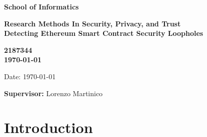 \documentclass[a4paper,11pt]{article}
\newcommand{\examnumber}{2187344}
\newcommand{\field}{Detecting Ethereum Smart Contract Security Loopholes}
\newcommand{\supervisor}{Lorenzo Martinico}
\begin{document}
\begin{minipage}[b]{110mm}
        {\Huge\bf School of Informatics
        \vspace*{17mm}}
\end{minipage}
\hfill
\begin{minipage}[t]{40mm}               
\end{minipage}
\par\noindent
\vspace*{2cm}
\begin{center}
        \Large\bf Research Methods In Security, Privacy, and Trust \\
        \Large\bf \field
\end{center}
\vspace*{1.5cm}
\begin{center}
        \bf \examnumber\\
        \monthyeardate\today
\end{center}
\vspace*{5mm}

%
%                       
\begin{abstract}

\end{abstract}

\vspace*{1cm}

\vspace*{3cm}
Date: \today

\vfill
{\bf Supervisor:} \supervisor
\newpage

\setcounter{page}{1}                            %
\footruleheight{1pt}
\headruleheight{1pt}
\rhead{- \thepage}
\cfoot{}
%

\section{Introduction}
\end{document}
